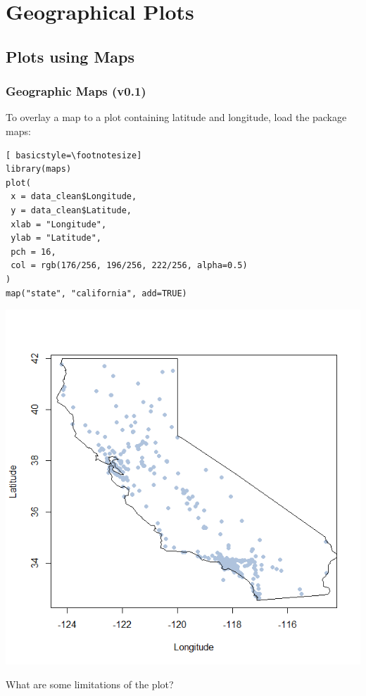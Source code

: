 

\section[Geographical Plots]{Geographical Plots}
\subsection{Plots using Maps}

\begin{frame}
\frametitle{Geographic Maps (v0.1)}

To overlay a map to a plot containing latitude and longitude, load the package \ttfamily maps: \normalfont 

\begin{lstlisting}[ basicstyle=\footnotesize]
library(maps)
plot(
 x = data_clean$Longitude, 
 y = data_clean$Latitude,
 xlab = "Longitude",
 ylab = "Latitude",
 pch = 16,
 col = rgb(176/256, 196/256, 222/256, alpha=0.5)
)
map("state", "california", add=TRUE)
\end{lstlisting}

\newpage
	\begin{center}
		\includegraphics[scale=0.25]{images/geoplot_v0.png}
	\end{center}
What are some limitations of the plot?
\end{frame}

